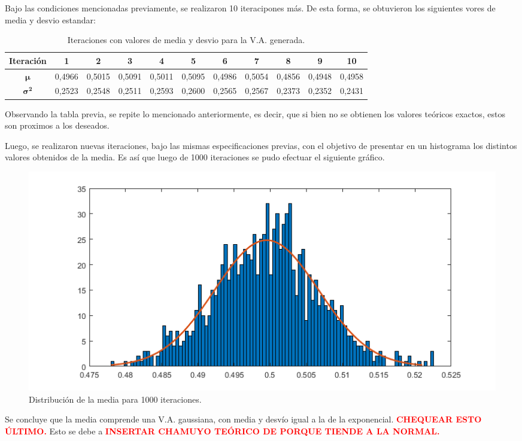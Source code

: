Bajo las condiciones mencionadas previamente, se realizaron 10 iteracipones más. De esta forma, se obtuvieron los siguientes vores de media y desvio estandar:
\begin{table}[H]
\centering
\begin{tabular}{ccccccccccc}
\hline
\textbf{Iteración}      & \textbf{1} & \textbf{2} & \textbf{3} & \textbf{4} & \textbf{5} & \textbf{6} & \textbf{7} & \textbf{8} & \textbf{9} & \textbf{10} \\ \hline
$\mathbf{\mu}$          & 0,4966     & 0,5015     & 0,5091     & 0,5011     & 0,5095     & 0,4986     & 0,5054     & 0,4856     & 0,4948     & 0,4958      \\
$\mathbf{{\sigma}^{2}}$ & 0,2523     & 0,2548     & 0,2511     & 0,2593     & 0,2600     & 0,2565     & 0,2567     & 0,2373     & 0,2352     & 0,2431     \\ \hline
\end{tabular}
\caption{Iteraciones con valores de media y desvio para la V.A. generada.}
\end{table}

Observando la tabla previa, se repite lo mencionado anteriormente, es decir, que si bien no se obtienen los valores teóricos exactos, estos son proximos a los deseados.

Luego, se realizaron nuevas iteraciones, bajo las mismas especificaciones previas, con el objetivo de presentar en un histograma los distintos valores obtenidos de la media. Es así que luego de 1000 iteraciones se pudo efectuar el siguiente gráfico.
\begin{figure}[H]
	\centering
	\includegraphics[width=0.8\linewidth]{./ImagenesEjercicio1/Media-1.png}
	\caption{Distribución de la media para 1000 iteraciones.}
	\label{fig:media-mc}
\end{figure}

Se concluye que la media comprende una V.A. gaussiana, con media y desvío igual a la de la exponencial. \textcolor{red}{\textbf{CHEQUEAR ESTO ÚLTIMO.}} Esto se debe a \textcolor{red}{\textbf{INSERTAR CHAMUYO TEÓRICO DE PORQUE TIENDE A LA NORMAL.}}

